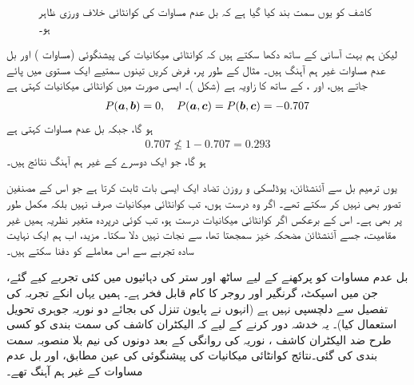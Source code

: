 \begin{figure}
\centering
{}
\caption{کاشف کو یوں سمت بند کیا گیا ہے کہ بل عدم مساوات کی کوانٹائی خلاف ورزی ظاہر ہو۔}
\label{شکل_بکھراو_بل_عدم_مساوات}
\end{figure}

لیکن ہم بہت آسانی کے ساتھ دکھا سکتے ہیں کہ کوانٹائی میکانیات کی پیشنگوئی (مساوات ) اور بل عدم مساوات غیر ہم آہنگ ہیں۔ مثال کے طور پر، فرض کریں تینوں سمتیے ایک مستوی میں پائے جاتے ہیں، اور ،  کے ساتھ  کا زاویہ  ہے (شکل )۔ ایسی صورت میں کوانٹائی میکانیات کہتی ہے 
\begin{align*}
	P({{\boldsymbol{a}}}, {{\boldsymbol{b}}}) = 0,\quad P({{\boldsymbol{a}}}, {{\boldsymbol{c}}}) = P({{\boldsymbol{b}}}, {{\boldsymbol{c}}}) =\num{-0.707}
\end{align*}
ہو گا، جبکہ بل عدم مساوات کہتی ہے 
\begin{align*}
	\num{0.707}\nleq 1-\num{0.707} = \num{0.293}
\end{align*}
ہو گا، جو ایک دوسرے کے غیر ہم آہنگ نتائج ہیں۔

 یوں ترمیم بل سے آئنشٹائن، پوڈلسکی و روزن تضاد ایک ایسی بات ثابت کرتا ہے جو اس کے مصنفین تصور بھی نہیں کر سکتے تھے۔ اگر وہ درست ہوں، تب کوانٹائی میکانیات صرف  نہیں بلکہ مکمل طور پر  بھی ہے۔ اس کے برعکس اگر کوانٹائی میکانیات درست ہو، تب کوئی درپردہ متغیر نظریہ ہمیں غیر مقامیت، جسے آئنشٹائن مضحکہ خیز سمجھتا تھا، سے نجات نہیں دلا سکتا۔ مزید، اب ہم ایک نہایت سادہ تجربے سے اس معاملے کو دفنا سکتے ہیں۔

بل عدم مساوات کو پرکھنے کے لیے ساٹھ اور ستر کی دہائیوں میں کئی تجربے کیے گئے، جن میں اسپکٹ، گرنگیر اور روجر کا کام قابل فخر ہے۔ ہمیں یہاں انکے تجربہ کی تفصیل سے دلچسپی نہیں ہے (انہوں نے پایون تنزل کی بجائے دو نوریہ جوہری تحویل استعمال کیا)۔ یہ خدشہ دور کرنے کے لیے کہ الیکٹران کاشف کی سمت بندی کو کسی طرح ضد الیکٹران کاشف ، نوریہ کی روانگی کے بعد دونوں کی نیم بلا منصوبہ سمت بندی کی گئی۔نتائج کوانٹائی میکانیات کی پیشنگوئی کی عین مطابق، اور بل عدم مساوات کے غیر ہم آہنگ تھے۔

